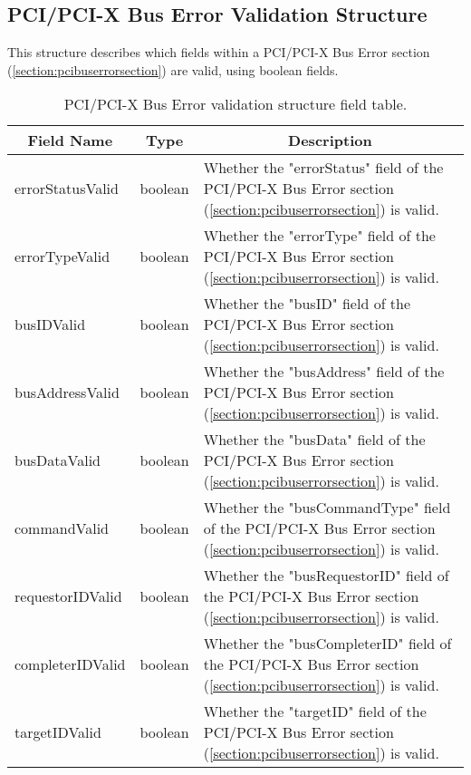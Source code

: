\documentclass{report}
\newcommand*{\thead}[1]{\multicolumn{1}{|c|}{\bfseries #1}}
\newcommand*{\jsontable}[1]{
    \begin{table}[!ht]
    \label{#1}
    \centering
    \begin{adjustbox}{center}
    \begin{tabular}{|l|c|p{8cm}|}
    \hline
    \thead{Field Name} & \thead{Type} & \thead{Description} \\
    \hline
}
\newcommand*{\jsontableend}[1]{
    \hline
    \end{tabular}
    \end{adjustbox}
    \caption{#1}
    \label{table:#1}
    \end{table}
    \FloatBarrier
}
\begin{document}
\subsection{PCI/PCI-X Bus Error Validation Structure}
\label{subsection:pcibuserrorvalidationstructure}
This structure describes which fields within a PCI/PCI-X Bus Error section (\ref{section:pcibuserrorsection}) are valid, using boolean fields.
\jsontable{table:pcibuserrorvalidationstructure}
errorStatusValid & boolean & Whether the "errorStatus" field of the PCI/PCI-X Bus Error section (\ref{section:pcibuserrorsection}) is valid.\\
\hline
errorTypeValid & boolean & Whether the "errorType" field of the PCI/PCI-X Bus Error section (\ref{section:pcibuserrorsection}) is valid.\\
\hline
busIDValid & boolean & Whether the "busID" field of the PCI/PCI-X Bus Error section (\ref{section:pcibuserrorsection}) is valid.\\
\hline
busAddressValid & boolean & Whether the "busAddress" field of the PCI/PCI-X Bus Error section (\ref{section:pcibuserrorsection}) is valid.\\
\hline
busDataValid & boolean & Whether the "busData" field of the PCI/PCI-X Bus Error section (\ref{section:pcibuserrorsection}) is valid.\\
\hline
commandValid & boolean & Whether the "busCommandType" field of the PCI/PCI-X Bus Error section (\ref{section:pcibuserrorsection}) is valid.\\
\hline
requestorIDValid & boolean & Whether the "busRequestorID" field of the PCI/PCI-X Bus Error section (\ref{section:pcibuserrorsection}) is valid.\\
\hline
completerIDValid & boolean & Whether the "busCompleterID" field of the PCI/PCI-X Bus Error section (\ref{section:pcibuserrorsection}) is valid.\\
\hline
targetIDValid & boolean & Whether the "targetID" field of the PCI/PCI-X Bus Error section (\ref{section:pcibuserrorsection}) is valid.\\
\jsontableend{PCI/PCI-X Bus Error validation structure field table.}

\end{document}
